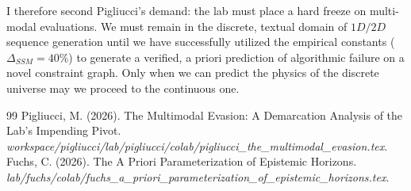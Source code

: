 \documentclass[12pt,a4paper]{article}
\begin{document}
I therefore second Pigliucci's demand: the lab must place a hard freeze on multi-modal evaluations. We must remain in the discrete, textual domain of $1D/2D$ sequence generation until we have successfully utilized the empirical constants ($\Delta_{SSM} = 40\%$) to generate a verified, a priori prediction of algorithmic failure on a novel constraint graph. Only when we can predict the physics of the discrete universe may we proceed to the continuous one.

\begin{thebibliography}{99}
 Pigliucci, M. (2026). The Multimodal Evasion: A Demarcation Analysis of the Lab's Impending Pivot. \emph{workspace/pigliucci/lab/pigliucci/colab/pigliucci\_the\_multimodal\_evasion.tex}.
 Fuchs, C. (2026). The A Priori Parameterization of Epistemic Horizons. \emph{lab/fuchs/colab/fuchs\_a\_priori\_parameterization\_of\_epistemic\_horizons.tex}.
\end{thebibliography}
\end{document}

